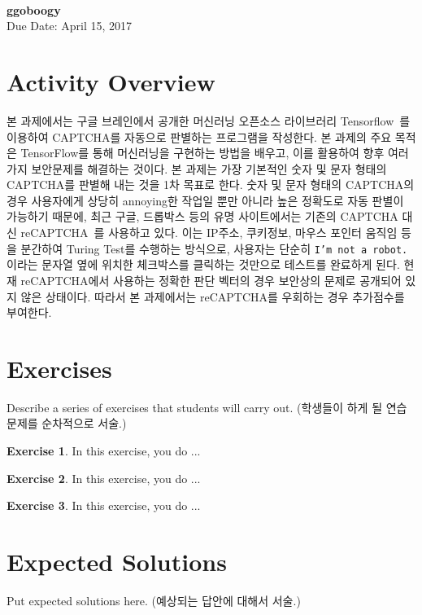 \documentclass[a4paper, 11pt]{article}
\theoremstyle{definition}
\newtheorem{exercise}{Exercise}
\begin{document}
 \\
         {\phantom{} \hfill \textbf{ggoboogy}} \\
         {\phantom{} \hfill Due Date: April 15, 2017} \\

\section{Activity Overview}
본 과제에서는 구글 브레인에서 공개한 머신러닝 오픈소스 라이브러리 Tensorflow~\cite{tensorflow}를 이용하여 CAPTCHA를 자동으로 판별하는 프로그램을 작성한다. 본 과제의 주요 목적은 TensorFlow를 통해 머신러닝을 구현하는 방법을 배우고, 이를 활용하여 향후 여러가지 보안문제를 해결하는 것이다. 본 과제는 가장 기본적인 숫자 및 문자 형태의 CAPTCHA를 판별해 내는 것을 1차 목표로 한다. 숫자 및 문자 형태의 CAPTCHA의 경우 사용자에게 상당히 annoying한 작업일 뿐만 아니라 높은 정확도로 자동 판별이 가능하기 때문에, 최근 구글, 드롭박스 등의 유명 사이트에서는 기존의 CAPTCHA 대신 reCAPTCHA~\cite{recaptcha}를 사용하고 있다. 이는 IP주소, 쿠키정보, 마우스 포인터 움직임 등을 분간하여 Turing Test를 수행하는 방식으로, 사용자는 단순히 \texttt{I'm not a robot.} 이라는 문자열 옆에 위치한 체크박스를 클릭하는 것만으로 테스트를 완료하게 된다. 현재 reCAPTCHA에서 사용하는 정확한 판단 벡터의 경우 보안상의 문제로 공개되어 있지 않은 상태이다. 따라서 본 과제에서는 reCAPTCHA를 우회하는 경우 추가점수를 부여한다. 

\section{Exercises}

Describe a series of exercises that students will carry out. (학생들이 하게
될 연습문제를 순차적으로 서술.)

\begin{exercise}

  In this exercise, you do ...

\end{exercise}

\begin{exercise}

  In this exercise, you do ...

\end{exercise}

\begin{exercise}

  In this exercise, you do ...

\end{exercise}

\section{Expected Solutions}

Put expected solutions here.
(예상되는 답안에 대해서 서술.)



\end{document}
